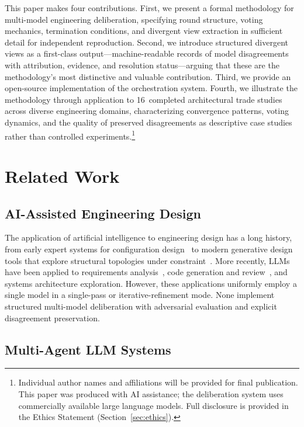 \documentclass[11pt,a4paper]{article}
\begin{document}
This paper makes four contributions. First, we present a formal methodology for multi-model engineering deliberation, specifying round structure, voting mechanics, termination conditions, and divergent view extraction in sufficient detail for independent reproduction. Second, we introduce structured divergent views as a first-class output---machine-readable records of model disagreements with attribution, evidence, and resolution status---arguing that these are the methodology's most distinctive and valuable contribution. Third, we provide an open-source implementation of the orchestration system. Fourth, we illustrate the methodology through application to 16~completed architectural trade studies across diverse engineering domains, characterizing convergence patterns, voting dynamics, and the quality of preserved disagreements as descriptive case studies rather than controlled experiments.\footnote{Individual author names and affiliations will be provided for final publication. This paper was produced with AI assistance; the deliberation system uses commercially available large language models. Full disclosure is provided in the Ethics Statement (Section~\ref{sec:ethics}).}

\section{Related Work}
\label{sec:related}

\subsection{AI-Assisted Engineering Design}

The application of artificial intelligence to engineering design has a long history, from early expert systems for configuration design~\cite{mcdermott1982r1} to modern generative design tools that explore structural topologies under constraint~\cite{autodesk2023generative}. More recently, LLMs have been applied to requirements analysis~\cite{arulmohan2023extracting}, code generation and review~\cite{chen2021codex}, and systems architecture exploration. However, these applications uniformly employ a single model in a single-pass or iterative-refinement mode. None implement structured multi-model deliberation with adversarial evaluation and explicit disagreement preservation.

\subsection{Multi-Agent LLM Systems}
\end{document}
